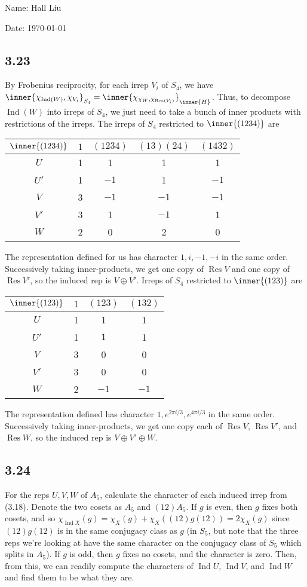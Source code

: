 \documentclass{article}
\DeclareMathOperator{\Res}{Res}
\DeclareMathOperator{\Ind}{Ind}
\begin{document}
Name: Hall Liu

Date: \today 
\vspace{1.5cm}
\subsection*{3.23}
By Frobenius reciprocity, for each irrep $V_i$ of $S_4$, we have $\inner{\chi_{\mathrm{Ind}(W)},\chi_{V_i}}_{S_4}=\inner{\chi_{\chi_W,\chi_{\mathrm{Res}(V_i)}}}_\inner{H}$. Thus, to decompose $\Ind(W)$ into irreps of $S_4$, we just need to take a bunch of inner products with restrictions of the irreps.
The irreps of $S_4$ restricted to $\inner{(1234)}$ are

\begin{tabular}{c|cccc}
    $\inner{(1234)}$&$1$&$(1234)$&$(13)(24)$&$(1432)$\\
    \hline
    $U$&1&1&1&1\\
    $U'$&1&$-1$&1&$-1$\\
    $V$&3&$-1$&$-1$&$-1$\\
    $V'$&3&1&$-1$&1\\
    $W$&2&0&2&0\\
\end{tabular}

The representation defined for us has character $1,i,-1,-i$ in the same order. Successively taking inner-products, we get one copy of $\Res V$ and one copy of $\Res V'$, so the induced rep is $V\oplus V'$.
Irreps of $S_4$ restricted to $\inner{(123)}$ are

\begin{tabular}{c|ccc}
    $\inner{(123)}$&$1$&$(123)$&$(132)$\\
    \hline
    $U$&1&1&1\\
    $U'$&1&$1$&1\\
    $V$&3&0&0\\
    $V'$&3&0&0\\
    $W$&2&$-1$&$-1$\\
\end{tabular}

The representation defined has character $1,e^{2\pi i/3},e^{4\pi i/3}$ in the same order. Successively taking inner-products, we get one copy each of $\Res V$, $\Res V'$, and $\Res W$, so the induced rep is $V\oplus V'\oplus W$.
\subsection*{3.24}
For the reps $U,V,W$ of $A_5$, calculate the character of each induced irrep from (3.18). Denote the two cosets as $A_5$ and $(12)A_5$. If $g$ is even, then $g$ fixes both cosets, and so $\chi_{\Ind X}(g)=\chi_X(g)+\chi_X((12)g(12))=2\chi_X(g)$ since $(12)g(12)$ is in the same conjugacy class as $g$ (in $S_5$, but note that the three reps we're looking at have the same character on the conjugacy class of $S_5$ which splits in $A_5$). If $g$ is odd, then $g$ fixes no cosets, and the character is zero. Then, from this, we can readily compute the characters of $\Ind U$, $\Ind V$, and $\Ind W$ and find them to be what they are. 
\end{document}
